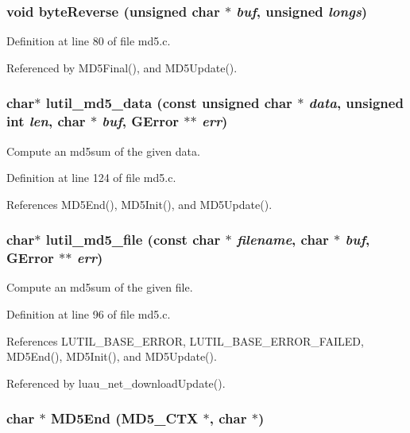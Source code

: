 \subsubsection{\setlength{\rightskip}{0pt plus 5cm}void byte\-Reverse (unsigned char $\ast$ {\em buf}, unsigned {\em longs})}\label{md5_8c_a10}




Definition at line 80 of file md5.c.

Referenced by MD5Final(), and MD5Update().
\subsubsection{\setlength{\rightskip}{0pt plus 5cm}char$\ast$ lutil\_\-md5\_\-data (const unsigned char $\ast$ {\em data}, unsigned int {\em len}, char $\ast$ {\em buf}, GError $\ast$$\ast$ {\em err})}\label{md5_8c_a12}


Compute an md5sum of the given data. 



Definition at line 124 of file md5.c.

References MD5End(), MD5Init(), and MD5Update().
\subsubsection{\setlength{\rightskip}{0pt plus 5cm}char$\ast$ lutil\_\-md5\_\-file (const char $\ast$ {\em filename}, char $\ast$ {\em buf}, GError $\ast$$\ast$ {\em err})}\label{md5_8c_a11}


Compute an md5sum of the given file. 



Definition at line 96 of file md5.c.

References LUTIL\_\-BASE\_\-ERROR, LUTIL\_\-BASE\_\-ERROR\_\-FAILED, MD5End(), MD5Init(), and MD5Update().

Referenced by luau\_\-net\_\-download\-Update().
\subsubsection{\setlength{\rightskip}{0pt plus 5cm}char $\ast$ MD5End ({\bf MD5\_\-CTX} $\ast$, char $\ast$)\hspace{0.3cm}{\tt  [static]}}\label{md5_8c_a9}




